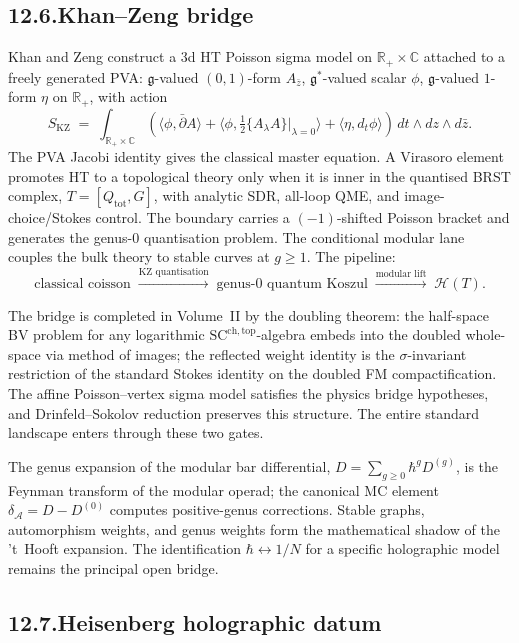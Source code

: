 \documentclass[11pt]{report}
\theoremstyle{definition}
\theoremstyle{remark}
\providecommand{\cA}{\mathcal{A}}
\providecommand{\cH}{\mathcal{H}}
\providecommand{\fg}{\mathfrak{g}}
\providecommand{\KZ}{\mathrm{KZ}}
\providecommand{\SCchtop}{\mathrm{SC}^{\mathrm{ch,top}}}
\providecommand{\bC}{\mathbb{C}}
\providecommand{\bR}{\mathbb{R}}
\numberwithin{equation}{section}
\begin{document}
\subsection*{12.6.\enspace Khan--Zeng bridge}

Khan and Zeng construct a 3d HT Poisson sigma model on
$\bR_+ \times \bC$ attached to a freely generated PVA:
$\fg$-valued $(0,1)$-form $A_{\bar z}$, $\fg^*$-valued scalar
$\phi$, $\fg$-valued $1$-form $\eta$ on $\bR_+$, with action
\[
S_{\KZ}
\;=\;
\int_{\bR_+\times\bC}
(\langle\phi, \bar\partial A\rangle
+ \langle\phi, \tfrac12\{A_\lambda A\}|_{\lambda=0}\rangle
+ \langle\eta, d_t\phi\rangle)\,dt\wedge dz\wedge d\bar z.
\]
The PVA Jacobi identity gives the classical master equation. A
Virasoro element promotes HT to a topological theory only when it is
inner in the quantised BRST complex, $T=[Q_{\mathrm{tot}},G]$, with
analytic SDR, all-loop QME, and image-choice/Stokes control. The
boundary carries a $(-1)$-shifted Poisson bracket and generates the
genus-$0$ quantisation problem. The conditional modular lane couples the
bulk theory to stable curves at $g \ge 1$. The pipeline:
\[
\text{classical coisson}
\;\xrightarrow{\text{KZ quantisation}}\;
\text{genus-$0$ quantum Koszul}
\;\xrightarrow{\text{modular lift}}\;
\cH(T).
\]

The bridge is completed in Volume~II by the doubling theorem:
the half-space BV problem for any logarithmic $\SCchtop$-algebra
embeds into the doubled whole-space via method of images; the
reflected weight identity is the $\sigma$-invariant restriction
of the standard Stokes identity on the doubled FM compactification.
The affine Poisson--vertex sigma model satisfies the physics
bridge hypotheses, and Drinfeld--Sokolov reduction preserves
this structure. The entire standard landscape enters through
these two gates.

The genus expansion of the modular bar differential,
$D = \sum_{g \ge 0} \hbar^g D^{(g)}$, is the Feynman transform
of the modular operad; the canonical MC element
$\delta_\cA = D - D^{(0)}$ computes positive-genus corrections.
Stable graphs, automorphism weights, and genus weights form the
mathematical shadow of the 't~Hooft expansion. The
identification $\hbar \leftrightarrow 1/N$ for a specific
holographic model remains the principal open bridge.

\subsection*{12.7.\enspace Heisenberg holographic datum}
\end{document}
